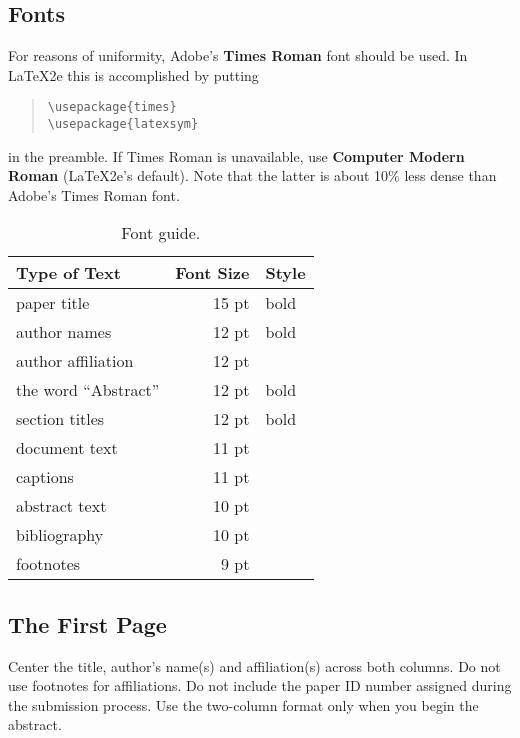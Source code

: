 \documentclass[11pt]{article}
\begin{document}
\subsection{Fonts}

For reasons of uniformity, Adobe's {\bf Times Roman} font should be
used. In \LaTeX2e{} this is accomplished by putting

\begin{quote}
\begin{verbatim}
\usepackage{times}
\usepackage{latexsym}
\end{verbatim}
\end{quote}
in the preamble. If Times Roman is unavailable, use {\bf Computer
  Modern Roman} (\LaTeX2e{}'s default).  Note that the latter is about
  10\% less dense than Adobe's Times Roman font.


\begin{table}[h]
\begin{center}
\begin{tabular}{|l|rl|}
\hline \bf Type of Text & \bf Font Size & \bf Style \\ \hline
paper title & 15 pt & bold \\
author names & 12 pt & bold \\
author affiliation & 12 pt & \\
the word ``Abstract'' & 12 pt & bold \\
section titles & 12 pt & bold \\
document text & 11 pt  &\\
captions & 11 pt & \\
abstract text & 10 pt & \\
bibliography & 10 pt & \\
footnotes & 9 pt & \\
\hline
\end{tabular}
\end{center}
\caption{\label{font-table} Font guide. }
\end{table}

\subsection{The First Page}
\label{ssec:first}

Center the title, author's name(s) and affiliation(s) across both
columns. Do not use footnotes for affiliations. Do not include the
paper ID number assigned during the submission process. Use the
two-column format only when you begin the abstract.
\end{document}
